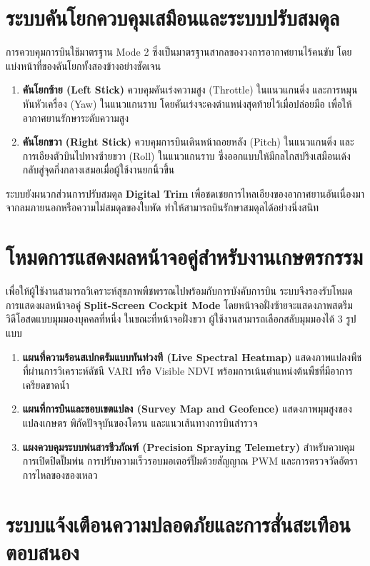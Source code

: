 \section{ระบบคันโยกควบคุมเสมือนและระบบปรับสมดุล}

การควบคุมการบินใช้มาตรฐาน Mode 2 ซึ่งเป็นมาตรฐานสากลของวงการอากาศยานไร้คนขับ โดยแบ่งหน้าที่ของคันโยกทั้งสองข้างอย่างชัดเจน
\begin{enumerate}
    \item \textbf{คันโยกซ้าย (Left Stick)} ควบคุมคันเร่งความสูง (Throttle) ในแนวแกนดิ่ง และการหมุนหันหัวเครื่อง (Yaw) ในแนวแกนราบ โดยคันเร่งจะคงตำแหน่งสุดท้ายไว้เมื่อปล่อยมือ เพื่อให้อากาศยานรักษาระดับความสูง
    \item \textbf{คันโยกขวา (Right Stick)} ควบคุมการบินเดินหน้าถอยหลัง (Pitch) ในแนวแกนดิ่ง และการเอียงตัวบินไปทางซ้ายขวา (Roll) ในแนวแกนราบ ซึ่งออกแบบให้มีกลไกสปริงเสมือนเด้งกลับสู่จุดกึ่งกลางเสมอเมื่อผู้ใช้งานยกนิ้วขึ้น
\end{enumerate}

ระบบยังผนวกส่วนการปรับสมดุล \textbf{Digital Trim} เพื่อชดเชยการไหลเอียงของอากาศยานอันเนื่องมาจากลมภายนอกหรือความไม่สมดุลของใบพัด ทำให้สามารถบินรักษาสมดุลได้อย่างนิ่งสนิท

\section{โหมดการแสดงผลหน้าจอคู่สำหรับงานเกษตรกรรม}

เพื่อให้ผู้ใช้งานสามารถวิเคราะห์สุขภาพพืชพรรณไปพร้อมกับการบังคับการบิน ระบบจึงรองรับโหมดการแสดงผลหน้าจอคู่ \textbf{Split-Screen Cockpit Mode} โดยหน้าจอฝั่งซ้ายจะแสดงภาพสตรีมวิดีโอสดแบบมุมมองบุคคลที่หนึ่ง ในขณะที่หน้าจอฝั่งขวา ผู้ใช้งานสามารถเลือกสลับมุมมองได้ 3 รูปแบบ
\begin{enumerate}
    \item \textbf{แผนที่ความร้อนสเปกตรัมแบบทันท่วงที (Live Spectral Heatmap)} แสดงภาพแปลงพืชที่ผ่านการวิเคราะห์ดัชนี VARI หรือ Visible NDVI พร้อมการเน้นตำแหน่งต้นพืชที่มีอาการเครียดขาดน้ำ
    \item \textbf{แผนที่การบินและขอบเขตแปลง (Survey Map and Geofence)} แสดงภาพมุมสูงของแปลงเกษตร พิกัดปัจจุบันของโดรน และแนวเส้นทางการบินสำรวจ
    \item \textbf{แผงควบคุมระบบพ่นสารชีวภัณฑ์ (Precision Spraying Telemetry)} สำหรับควบคุมการเปิดปิดปั๊มพ่น การปรับความเร็วรอบมอเตอร์ปั๊มด้วยสัญญาณ PWM และการตรวจวัดอัตราการไหลของของเหลว
\end{enumerate}

\section{ระบบแจ้งเตือนความปลอดภัยและการสั่นสะเทือนตอบสนอง}


